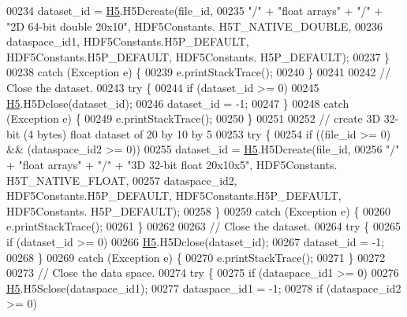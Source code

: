 \begin{DoxyCode}
00234                 dataset\_id = \hyperlink{namespace_h5}{H5}.H5Dcreate(file\_id,
00235                         \textcolor{stringliteral}{"/"} + \textcolor{stringliteral}{"float arrays"} + \textcolor{stringliteral}{"/"} + \textcolor{stringliteral}{"2D 64-bit double 20x10"}, HDF5Constants.
      H5T\_NATIVE\_DOUBLE,
00236                         dataspace\_id1, HDF5Constants.H5P\_DEFAULT, HDF5Constants.H5P\_DEFAULT, HDF5Constants.
      H5P\_DEFAULT);
00237         \}
00238         \textcolor{keywordflow}{catch} (Exception e) \{
00239             e.printStackTrace();
00240         \}
00241 
00242         \textcolor{comment}{// Close the dataset.}
00243         \textcolor{keywordflow}{try} \{
00244             \textcolor{keywordflow}{if} (dataset\_id >= 0)
00245                 \hyperlink{namespace_h5}{H5}.H5Dclose(dataset\_id);
00246             dataset\_id = -1;
00247         \}
00248         \textcolor{keywordflow}{catch} (Exception e) \{
00249             e.printStackTrace();
00250         \}
00251 
00252         \textcolor{comment}{// create 3D 32-bit (4 bytes) float dataset of 20 by 10 by 5}
00253         \textcolor{keywordflow}{try} \{
00254             \textcolor{keywordflow}{if} ((file\_id >= 0) && (dataspace\_id2 >= 0))
00255                 dataset\_id = \hyperlink{namespace_h5}{H5}.H5Dcreate(file\_id,
00256                         \textcolor{stringliteral}{"/"} + \textcolor{stringliteral}{"float arrays"} + \textcolor{stringliteral}{"/"} + \textcolor{stringliteral}{"3D 32-bit float  20x10x5"}, HDF5Constants.
      H5T\_NATIVE\_FLOAT,
00257                         dataspace\_id2, HDF5Constants.H5P\_DEFAULT, HDF5Constants.H5P\_DEFAULT, HDF5Constants.
      H5P\_DEFAULT);
00258         \}
00259         \textcolor{keywordflow}{catch} (Exception e) \{
00260             e.printStackTrace();
00261         \}
00262 
00263         \textcolor{comment}{// Close the dataset.}
00264         \textcolor{keywordflow}{try} \{
00265             \textcolor{keywordflow}{if} (dataset\_id >= 0)
00266                 \hyperlink{namespace_h5}{H5}.H5Dclose(dataset\_id);
00267             dataset\_id = -1;
00268         \}
00269         \textcolor{keywordflow}{catch} (Exception e) \{
00270             e.printStackTrace();
00271         \}
00272 
00273         \textcolor{comment}{// Close the data space.}
00274         \textcolor{keywordflow}{try} \{
00275             \textcolor{keywordflow}{if} (dataspace\_id1 >= 0)
00276                 \hyperlink{namespace_h5}{H5}.H5Sclose(dataspace\_id1);
00277             dataspace\_id1 = -1;
00278             \textcolor{keywordflow}{if} (dataspace\_id2 >= 0)

\end{DoxyCode}
